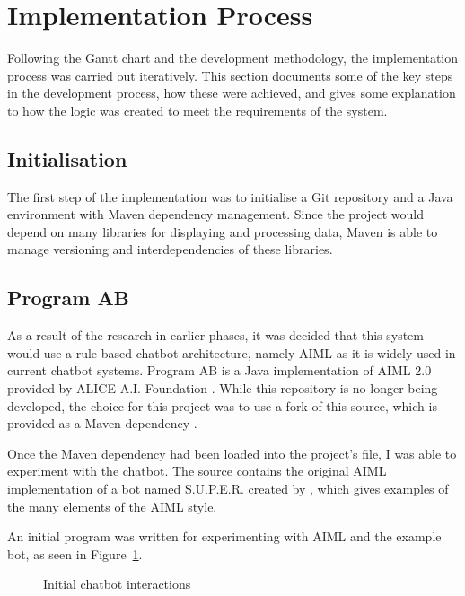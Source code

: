 \section{Implementation Process}
Following the Gantt chart and the development methodology, the implementation process was carried out iteratively. This section documents some of the key steps in the development process, how these were achieved, and gives some explanation to how the logic was created to meet the requirements of the system.

\subsection{Initialisation}
The first step of the implementation was to initialise a Git repository and a Java environment with Maven dependency management. Since the project would depend on many libraries for displaying and processing data, Maven is able to manage versioning and interdependencies of these libraries.

\subsection{Program AB}
As a result of the research in earlier phases, it was decided that this system would use a rule-based chatbot architecture, namely AIML as it is widely used in current chatbot systems. Program AB is a Java implementation of AIML 2.0 provided by ALICE A.I. Foundation \cite{programab_2013}. While this repository is no longer being developed, the choice for this project was to use a fork of this source, which is provided as a Maven dependency \cite{lumenrobot2016}.

Once the Maven dependency had been loaded into the project's  file, I was able to experiment with the chatbot. The  source contains the original AIML implementation of a bot named S.U.P.E.R. created by \citet{wallace2009anatomy}, which gives examples of the many elements of the AIML style.

An initial program was written for experimenting with AIML and the example bot, as seen in Figure~\ref{fig:super}. 

\begin{figure}[h]
	\centering
	\qquad
	\caption{Initial chatbot interactions}
	\label{fig:super}
\end{figure}

